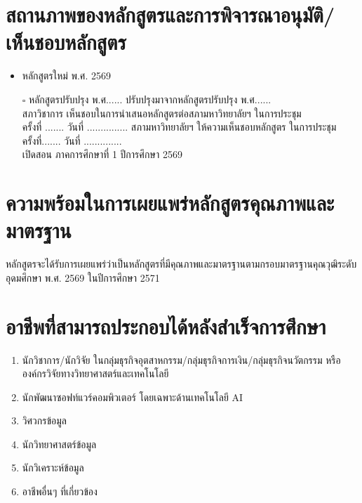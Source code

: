 \section{สถานภาพของหลักสูตรและการพิจารณาอนุมัติ/เห็นชอบหลักสูตร}
\begin{itemize}
	\item หลักสูตรใหม่ พ.ศ. 2569
	\item[$\square$] หลักสูตรปรับปรุง พ.ศ......  ปรับปรุงมาจากหลักสูตรปรับปรุง พ.ศ......\\
	สภาวิชาการ เห็นชอบในการนำเสนอหลักสูตรต่อสภามหาวิทยาลัยฯ ในการประชุม \\ ครั้งที่ ....... วันที่ ...............
	สภามหาวิทยาลัยฯ ให้ความเห็นชอบหลักสูตร ในการประชุม \\ ครั้งที่....... วันที่ .............. \\
	เปิดสอน ภาคการศึกษาที่ 1 ปีการศึกษา 2569
\end{itemize}
\section{ความพร้อมในการเผยแพร่หลักสูตรคุณภาพและมาตรฐาน}
	หลักสูตรจะได้รับการเผยแพร่ว่าเป็นหลักสูตรที่มีคุณภาพและมาตรฐานตามกรอบมาตรฐานคุณวุฒิระดับอุดมศึกษา พ.ศ. 2569 ในปีการศึกษา 2571
\section{อาชีพที่สามารถประกอบได้หลังสำเร็จการศึกษา}
\begin{enumerate}
	\item นักวิชาการ/นักวิจัย ในกลุ่มธุรกิจอุตสาหกรรม/กลุ่มธุรกิจการเงิน/กลุ่มธุรกิจนวัตกรรม หรือองค์กรวิจัยทางวิทยาศาสตร์และเทคโนโลยี
	\item นักพัฒนาซอฟท์แวร์คอมพิวเตอร์ โดยเฉพาะด้านเทคโนโลยี AI
	\item วิศวกรข้อมูล 
	\item นักวิทยาศาสตร์ข้อมูล
	\item นักวิเคราะห์ข้อมูล 
	\item อาชีพอื่นๆ ที่เกี่ยวข้อง
\end{enumerate}


